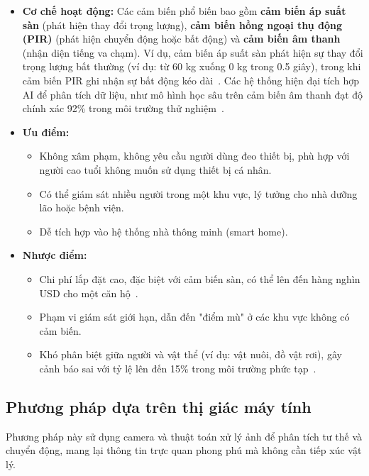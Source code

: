 \begin{itemize}
    \item \textbf{Cơ chế hoạt động:} Các cảm biến phổ biến bao gồm \textbf{cảm biến áp suất sàn} (phát hiện thay đổi trọng lượng), \textbf{cảm biến hồng ngoại thụ động (PIR)} (phát hiện chuyển động hoặc bất động) và \textbf{cảm biến âm thanh} (nhận diện tiếng va chạm). Ví dụ, cảm biến áp suất sàn phát hiện sự thay đổi trọng lượng bất thường (ví dụ: từ 60 kg xuống 0 kg trong 0.5 giây), trong khi cảm biến PIR ghi nhận sự bất động kéo dài~\cite{smartfloor2024}. Các hệ thống hiện đại tích hợp AI để phân tích dữ liệu, như mô hình học sâu trên cảm biến âm thanh đạt độ chính xác 92\% trong môi trường thử nghiệm~\cite{chen2024}. 
    \item \textbf{Ưu điểm:} 
    \begin{itemize}
        \item Không xâm phạm, không yêu cầu người dùng đeo thiết bị, phù hợp với người cao tuổi không muốn sử dụng thiết bị cá nhân.
        \item Có thể giám sát nhiều người trong một khu vực, lý tưởng cho nhà dưỡng lão hoặc bệnh viện.
        \item Dễ tích hợp vào hệ thống nhà thông minh (smart home).
    \end{itemize}
    \item \textbf{Nhược điểm:}
    \begin{itemize}
        \item Chi phí lắp đặt cao, đặc biệt với cảm biến sàn, có thể lên đến hàng nghìn USD cho một căn hộ~\cite{smartfloor2024}.
        \item Phạm vi giám sát giới hạn, dẫn đến "điểm mù" ở các khu vực không có cảm biến.
        \item Khó phân biệt giữa người và vật thể (ví dụ: vật nuôi, đồ vật rơi), gây cảnh báo sai với tỷ lệ lên đến 15\% trong môi trường phức tạp~\cite{chen2024}.
    \end{itemize}
\end{itemize}

\subsection{Phương pháp dựa trên thị giác máy tính}

Phương pháp này sử dụng camera và thuật toán xử lý ảnh để phân tích tư thế và chuyển động, mang lại thông tin trực quan phong phú mà không cần tiếp xúc vật lý.

